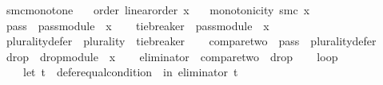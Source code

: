 \begin{isabellebody}
{\isafolddocument}%
%
\isadelimdocument
%
\endisadelimdocument
{}\isamarkupfalse%
\ smc{\isacharunderscore}{\kern0pt}monotone{\isacharcolon}{\kern0pt}\isanewline
\ \ \ order{\isacharcolon}{\kern0pt}\ {\isachardoublequoteopen}linear{\isacharunderscore}{\kern0pt}order\ x{\isachardoublequoteclose}\isanewline
\ \ \ {\isachardoublequoteopen}monotonicity\ {\isacharparenleft}{\kern0pt}smc\ x{\isacharparenright}{\kern0pt}{\isachardoublequoteclose}\isanewline
%
\isadelimproof
%
\endisadelimproof
%
\isatagproof
{}\isamarkupfalse%
\ {\isacharminus}{\kern0pt}\isanewline
\isanewline
\ \ \isamarkupfalse%
\ {\isacharquery}{\kern0pt}pass{}\ {\isacharequal}{\kern0pt}\ {\isachardoublequoteopen}pass{\isacharunderscore}{\kern0pt}module\ {}\ x{\isachardoublequoteclose}\isanewline
\ \ \isamarkupfalse%
\ {\isacharquery}{\kern0pt}tie{\isacharunderscore}{\kern0pt}breaker\ {\isacharequal}{\kern0pt}\ {\isachardoublequoteopen}{\isacharparenleft}{\kern0pt}pass{\isacharunderscore}{\kern0pt}module\ {}\ x{\isacharparenright}{\kern0pt}{\isachardoublequoteclose}\isanewline
\ \ \isamarkupfalse%
\ {\isacharquery}{\kern0pt}plurality{\isacharunderscore}{\kern0pt}defer\ {\isacharequal}{\kern0pt}\ {\isachardoublequoteopen}{\isacharparenleft}{\kern0pt}plurality{\isasymdown}{\isacharparenright}{\kern0pt}\ {\isasymtriangleright}\ {\isacharquery}{\kern0pt}tie{\isacharunderscore}{\kern0pt}breaker{\isachardoublequoteclose}\isanewline
\ \ \isamarkupfalse%
\ {\isacharquery}{\kern0pt}compare{\isacharunderscore}{\kern0pt}two\ {\isacharequal}{\kern0pt}\ {\isachardoublequoteopen}{\isacharquery}{\kern0pt}pass{}\ {\isasymtriangleright}\ {\isacharquery}{\kern0pt}plurality{\isacharunderscore}{\kern0pt}defer{\isachardoublequoteclose}\isanewline
\ \ \isamarkupfalse%
\ {\isacharquery}{\kern0pt}drop{}\ {\isacharequal}{\kern0pt}\ {\isachardoublequoteopen}drop{\isacharunderscore}{\kern0pt}module\ {}\ x{\isachardoublequoteclose}\isanewline
\ \ \isamarkupfalse%
\ {\isacharquery}{\kern0pt}eliminator\ {\isacharequal}{\kern0pt}\ {\isachardoublequoteopen}{\isacharquery}{\kern0pt}compare{\isacharunderscore}{\kern0pt}two\ {\isasymparallel}\isactrlsub {\isasymup}\ {\isacharquery}{\kern0pt}drop{}{\isachardoublequoteclose}\isanewline
\ \ \isamarkupfalse%
\ {\isacharquery}{\kern0pt}loop\ {\isacharequal}{\kern0pt}\isanewline
\ \ \ \ {\isachardoublequoteopen}let\ t\ {\isacharequal}{\kern0pt}\ defer{\isacharunderscore}{\kern0pt}equal{\isacharunderscore}{\kern0pt}condition\ {}\ in\ {\isacharparenleft}{\kern0pt}{\isacharquery}{\kern0pt}eliminator\ {\isasymcirclearrowleft}\isactrlsub t{\isacharparenright}{\kern0pt}{\isachardoublequoteclose}\isanewline

\end{isabellebody}
